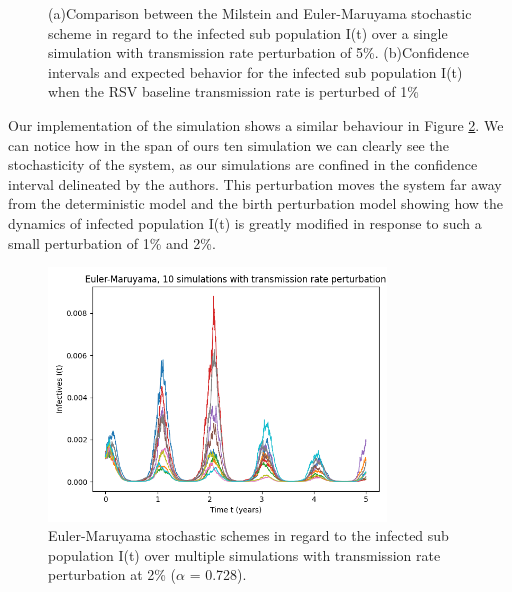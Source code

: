 \begin{figure}[h!]
\begin{subfigure}{0.4\textwidth}
        \caption{}
    \end{subfigure}
    \caption{(a)Comparison between the Milstein and Euler-Maruyama stochastic scheme in regard to the infected sub population I(t) over a single simulation with transmission rate perturbation of 5\%.
    (b)Confidence intervals and expected behavior for the infected sub population I(t) when the RSV baseline transmission rate is perturbed of 1\%}
    \label{transmission1}
\end{figure}

Our implementation of the simulation shows a similar behaviour in Figure \ref{transmission2}. We can notice how in the span of ours ten simulation we can clearly see the stochasticity of the system, as our simulations are confined in the confidence interval delineated by the authors. This perturbation moves the system far away from the deterministic model and the birth perturbation model showing how the dynamics of infected population I(t) is greatly modified in response to such a small perturbation of 1\% and 2\%.

\begin{figure}[h!]
  \centering
  \includegraphics[width=0.8\textwidth]{IMG/transmission_aphabig_I(t).png}
  \caption{Euler-Maruyama stochastic schemes in regard to the infected sub population I(t) over multiple simulations with transmission rate perturbation at 2\% ($\alpha$ = 0.728).}
  \label{transmission2}
\end{figure}

